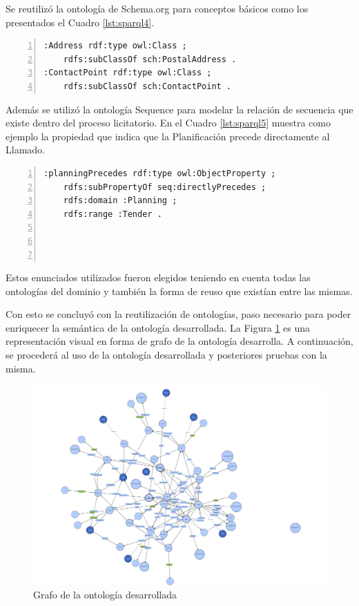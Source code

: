  Se reutilizó la ontología de Schema.org para conceptos básicos como los presentados el Cuadro \ref{lst:sparql4}.\hfill \break

\noindent\begin{minipage}{\textwidth}
 \begin{lstlisting}[captionpos=b, caption={Reutilizacion de Schema.org}, label={lst:sparql4},  numbers=left,  numberstyle=\tiny\color{mygray},
    basicstyle=\ttfamily,frame=single]
:Address rdf:type owl:Class ;
    rdfs:subClassOf sch:PostalAddress .
:ContactPoint rdf:type owl:Class ;
    rdfs:subClassOf sch:ContactPoint .
 \end{lstlisting}
\end{minipage}

 Además se utilizó la ontología Sequence para modelar la relación de secuencia que existe dentro del proceso licitatorio. En el Cuadro \ref{lst:sparql5} muestra como ejemplo la propiedad que indica que la Planificación precede directamente al Llamado.\hfill \break


\noindent\begin{minipage}{\textwidth}
 \begin{lstlisting}[captionpos=b, caption={Reutilizacion del patron de Secuencia}, label={lst:sparql5},  numbers=left,  numberstyle=\tiny\color{mygray},
    basicstyle=\ttfamily,frame=single]
:planningPrecedes rdf:type owl:ObjectProperty ;
    rdfs:subPropertyOf seq:directlyPrecedes ;
    rdfs:domain :Planning ;
    rdfs:range :Tender .




 \end{lstlisting}
\end{minipage}

Estos enunciados utilizados fueron elegidos teniendo en cuenta todas las ontologías del dominio y también la forma de reuso que existían entre las mismas. 

Con esto se concluyó con la reutilización de ontologías, paso necesario para poder enriquecer la semántica de la ontología desarrollada. La Figura \ref{img:grafo ontologia desarrolla} es una representación visual en forma de grafo de la ontología desarrolla. A continuación, se procederá al uso de la ontología desarrollada y posteriores pruebas con la misma.

\begin{figure}[ht!]
    \centering
    \includegraphics[width=150mm]{figuras/grafoOntologia2.png}
    \caption{Grafo de la ontología desarrollada}
    \label{img:grafo ontologia desarrolla}
    \end{figure}